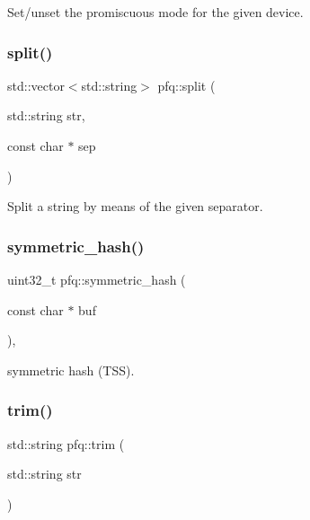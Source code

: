 Set/unset the promiscuous mode for the given device. 

\mbox{\label{namespacepfq_a0c3aeb61dfd544cb08cb240202caf213}} 
\subsubsection{\texorpdfstring{split()}{split()}}
{\footnotesize\ttfamily std\+::vector$<$std\+::string$>$ pfq\+::split (\begin{DoxyParamCaption}\item[{std\+::string}]{str,  }\item[{const char $\ast$}]{sep }\end{DoxyParamCaption})\hspace{0.3cm}{\ttfamily [inline]}}



Split a string by means of the given separator. 

\mbox{\label{namespacepfq_acd3646943e133a2651876f9ca0bd154c}} 
\subsubsection{\texorpdfstring{symmetric\+\_\+hash()}{symmetric\_hash()}}
{\footnotesize\ttfamily uint32\+\_\+t pfq\+::symmetric\+\_\+hash (\begin{DoxyParamCaption}\item[{const char $\ast$}]{buf }\end{DoxyParamCaption})\hspace{0.3cm}{\ttfamily [inline]}, {\ttfamily [noexcept]}}



symmetric hash (T\+SS). 

\mbox{\label{namespacepfq_a02a1861a64cc518394d3cc4361799c9f}} 
\subsubsection{\texorpdfstring{trim()}{trim()}}
{\footnotesize\ttfamily std\+::string pfq\+::trim (\begin{DoxyParamCaption}\item[{std\+::string}]{str }\end{DoxyParamCaption})\hspace{0.3cm}{\ttfamily [inline]}}



